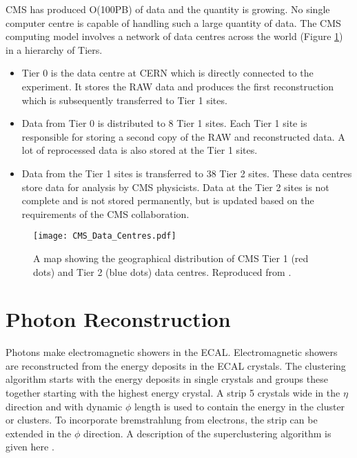 CMS has produced O(100PB) of data and the quantity is growing. No single computer
centre is capable of handling such a large quantity of data. The CMS computing
model involves a network of data centres across the world (Figure 
\ref{fig:CMS_Data_Centres}) in a hierarchy of Tiers. 

\begin{itemize}
\item Tier 0 is the data centre at CERN which is directly connected to the
experiment. It stores the RAW data and produces the first reconstruction which
is subsequently transferred to Tier 1 sites. 
\item Data from Tier 0 is distributed to 8 Tier 1 sites. Each Tier 1 site is 
responsible for storing a second copy of the RAW and reconstructed data. A lot 
of reprocessed data is also stored at the Tier 1 sites. 
\item Data from the Tier 1 sites is transferred to 38 Tier 2 sites. These data
centres store data for analysis by CMS physicists. Data at the Tier 2 sites is
not complete and is not stored permanently, but is updated based on the
requirements of the CMS collaboration. 
\end{itemize}

\begin{figure}
\texttt{[image: CMS\_Data\_Centres.pdf]}
\caption{A map showing the geographical distribution of CMS Tier 1 (red dots)
and Tier 2 (blue dots) data centres. Reproduced from \cite{grid}.}
\label{fig:CMS_Data_Centres}
\end{figure}

\section{Photon Reconstruction}
\label{sec:photon_recontruction}

Photons make electromagnetic showers in the ECAL. Electromagnetic showers are 
reconstructed from the energy deposits in the ECAL crystals. The clustering 
algorithm starts with the energy deposits in single crystals and groups these 
together starting with the highest energy crystal. A strip 5 crystals wide in 
the $\eta$ direction and with dynamic $\phi$ length is used to contain the 
energy in the cluster or clusters. To incorporate bremstrahlung from electrons, 
the strip can be extended in the $\phi$ direction. A description of the
superclustering algorithm is given here \cite{supercluster}. \\ 

